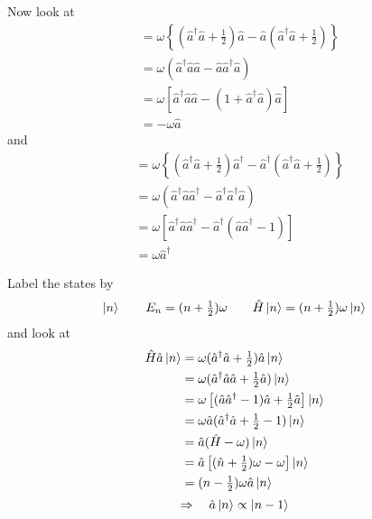 \documentclass{article}
\begin{document}
\noindent Now look at
\begin{align*}
[ \hat{H}, \hat{a} ] &= \omega \left\lbrace ( \hat{a}^\dagger \hat{a} + \tfrac{1}{2} ) \hat{a} - \hat{a} ( \hat{a}^\dagger \hat{a} + \tfrac{1}{2} ) \right\rbrace \\
&= \omega ( \hat{a}^\dagger \hat{a} \hat{a} - \hat{a} \hat{a}^\dagger \hat{a} ) \nonumber\\
&= \omega [ \hat{a}^\dagger \hat{a} \hat{a} - ( 1 + \hat{a}^\dagger \hat{a} ) \hat{a} ] \\
&= -\omega \hat{a}
\end{align*}
and
\begin{align*}
[ \hat{H}, \hat{a}^\dagger ] &= \omega \left\lbrace ( \hat{a}^\dagger \hat{a} + \tfrac{1}{2} ) \hat{a}^\dagger - \hat{a}^\dagger ( \hat{a}^\dagger \hat{a} + \tfrac{1}{2} ) \right\rbrace \\
&= \omega ( \hat{a}^\dagger \hat{a} \hat{a}^\dagger - \hat{a}^\dagger \hat{a}^\dagger \hat{a} ) \\
&= \omega [ \hat{a}^\dagger \hat{a} \hat{a}^\dagger - \hat{a}^\dagger ( \hat{a} \hat{a}^\dagger - 1 ) ] \\
&= \omega \hat{a}^\dagger
\end{align*}


\noindent Label the states by
\begin{equation*}
\ket{n} \qquad E_n = ( n + \tfrac{1}{2} ) \omega \qquad \hat{H} \ket{n} = ( n + \tfrac{1}{2} ) \omega \ket{n}
\end{equation*}
and look at
\begin{align*}
\hat{H} \hat{a} \ket{n} &= \omega ( \hat{a}^\dagger \hat{a} + \tfrac{1}{2} ) \hat{a} \ket{n} \\
&= \omega ( \hat{a}^\dagger \hat{a} \hat{a} + \tfrac{1}{2} \hat{a} ) \ket{n} \nonumber\\
&= \omega \left[ ( \hat{a} \hat{a}^\dagger - 1 ) \hat{a} + \tfrac{1}{2} \hat{a} \right] \ket{n} \\
&= \omega \hat{a} ( \hat{a}^\dagger \hat{a} + \tfrac{1}{2} - 1 ) \ket{n} \\
&= \hat{a} ( \hat{H} - \omega ) \ket{n} \\
&= \hat{a} \left[ ( \hat{n} + \tfrac{1}{2} ) \omega - \omega \right] \ket{n} \\
&= ( n - \tfrac{1}{2} ) \omega \hat{a} \ket{n}
\end{align*}
\begin{equation*}
\Rightarrow \quad \hat{a} \ket{n} \propto \ket{n-1}
\end{equation*}
\end{document}

